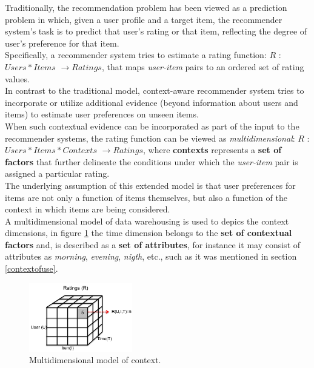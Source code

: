 Traditionally, the recommendation problem has been viewed as a
prediction problem in which, given a user profile and a target item,
the recommender system's task is to predict that user's rating or that
item, reflecting the degree of user's preference for that 
item\cite{jannach2010recommender}. \\
Specifically, a recommender system tries to estimate a rating
function: $R$ : $Users * Items$ $ \rightarrow Ratings$, that maps
\textit{user-item} pairs to an ordered  set of rating values.\\
In contrast to the traditional model, context-aware recommender system
tries to incorporate or utilize additional evidence (beyond
information about users and items) to estimate user preferences on
unseen items.\\ When such contextual evidence can be incorporated as
part of the input to the recommender systems, the rating function can
be viewed as \textit{multidimensional}: $R$ : $Users * Items *
Contexts$ $ \rightarrow Ratings$, where \textbf{contexts} represents a
\textbf{set of factors} that further delineate the conditions under which the
\textit{user-item} pair is assigned a particular rating. \\ The
underlying assumption of this extended model is that user preferences
for items are not only a function of items themselves, but also a
function of the context in which items are being
considered\cite{lim2009assessing}. \\
A multidimensional model of data warehousing\cite{kimball2011data} is
used to depics the context dimensions, in figure
\ref{fig:multidimension} the time dimension belongs to the \textbf{set of 
contextual factors} and, is described as a \textbf{set of
attributes}, for instance it may consist of
attributes as \textit{morning}, \textit{evening},  \textit{nigth},
etc., such as it was mentioned in section  \ref{contextofuse}. 
\begin{figure}
\captionsetup{font=footnotesize}
\centering
\includegraphics[width=0.40\textwidth]{img/multidimension.png}
\small
\caption{Multidimensional model of context.}
\label{fig:multidimension}   
\end{figure}

